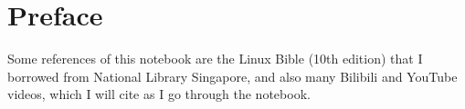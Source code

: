\chapter*{Preface}

Some references of this notebook are the Linux Bible (10th edition) that I borrowed from National Library Singapore, and also many Bilibili and YouTube videos, which I will cite as I go through the notebook. 